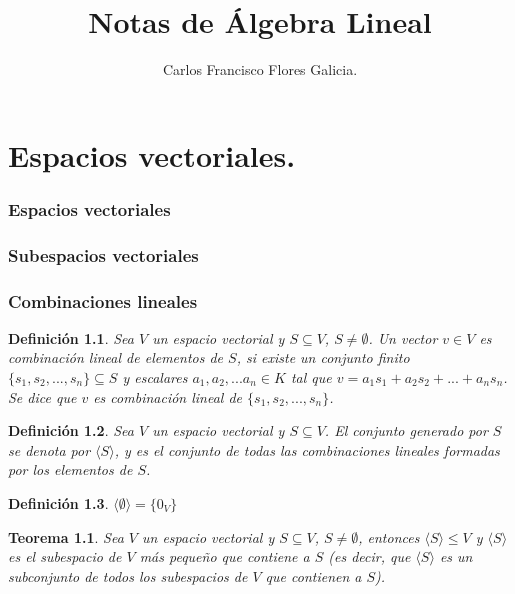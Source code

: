 \documentclass{book}
\title{Notas de Álgebra Lineal}
\author{Carlos Francisco Flores Galicia.}
\date{}
\newtheorem{theorem}{Teorema}
\newtheorem{definition}{Definición}
\begin{document}
\maketitle

\chapter{Espacios vectoriales.}
\subsection{Espacios vectoriales}
\subsection{Subespacios vectoriales}
\subsection{Combinaciones lineales}

\begin{definition}
Sea $V$ un espacio vectorial y $S \subseteq V$, $S \neq \emptyset$. Un vector $v \in V$ es combinación lineal de elementos de $S$, si existe un conjunto finito $\{s_1,s_2,...,s_n\}\subseteq S$ y escalares $a_1,a_2,...a_n \in K$ tal que $v=a_1 s_1+a_2 s_2+...+a_n s_n$. Se dice que $v$ es combinación lineal de $\{s_1,s_2,...,s_n\}$.
\end{definition}

\begin{definition}
Sea $V$ un espacio vectorial y $S \subseteq V$. El conjunto generado por $S$ se denota por $\langle S \rangle$, y es el conjunto de todas las combinaciones lineales formadas por los elementos de $S$.
\end{definition}

\begin{definition}
$\langle \emptyset \rangle=\{0_V\}$
\end{definition}

\begin{theorem}
Sea $V$ un espacio vectorial y $S \subseteq V$, $S \neq \emptyset$, entonces $\langle S \rangle \leq V$ y $\langle S \rangle$ es el subespacio de $V$ más pequeño que contiene a $S$ (es decir, que $\langle S \rangle$ es un subconjunto de todos los subespacios de $V$ que contienen a $S$).
\end{theorem}
\end{document}
